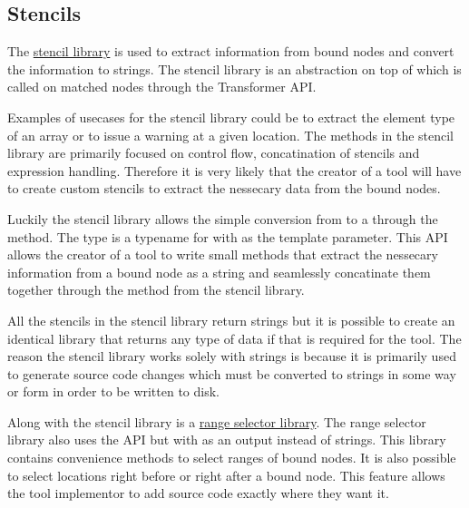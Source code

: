 \subsection{Stencils} \label{subsec:080stencils}

The \href{https://github.com/llvm/llvm-project/blob/main/clang/include/clang/Tooling/Transformer/Stencil.h}{stencil library} is used to extract information from bound nodes and convert the information to strings.  The stencil library is an abstraction on top of  which is called on matched nodes through the Transformer API. 

Examples of usecases for the stencil library could be to extract the element type of an array or to issue a warning at a given location. The methods in the stencil library are primarily focused on control flow, concatination of stencils and expression handling. Therefore it is very likely that the creator of a tool will have to create custom stencils to extract the nessecary data from the bound nodes.

Luckily the stencil library allows the simple conversion from  to a  through the  method. The  type is a typename for  with  as the template parameter. This API allows the creator of a tool to write small methods that extract the nessecary information from a bound node as a string and seamlessly concatinate them together through the  method from the stencil library.

All the stencils in the stencil library return strings but it is possible to create an identical library that returns any type of data if that is required for the tool. The reason the stencil library works solely with strings is because it is primarily used to generate source code changes which must be converted to strings in some way or form in order to be written to disk. 

Along with the stencil library is a \href{https://github.com/llvm/llvm-project/blob/main/clang/include/clang/Tooling/Transformer/RangeSelector.h}{range selector library}. The range selector library also uses the  API but with  as an output instead of strings. This library contains convenience methods to select ranges of bound nodes. It is also possible to select locations right before or right after a bound node. This feature allows the tool implementor to add source code exactly where they want it.

